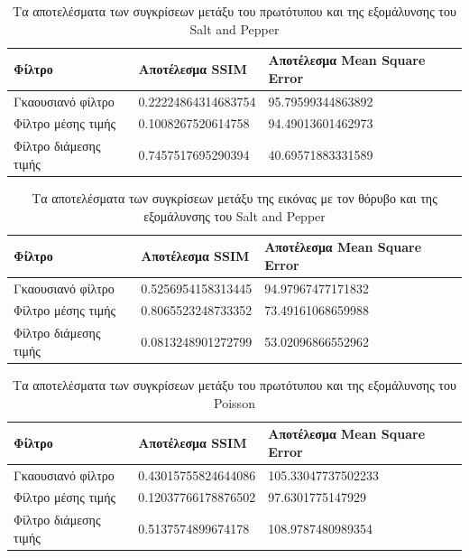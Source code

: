 \begin{table}
	\begin{tabular}{| p{2cm} | p{7cm} | p{6.5cm} |}
	\hline
	\textbf{Φίλτρο} & \textbf{Αποτέλεσμα SSIM} & \textbf{Αποτέλεσμα Mean Square Error} \\
	\hline
	Γκαουσιανό φίλτρο & 0.22224864314683754 & 95.79599344863892 \\
	\hline
	Φίλτρο μέσης τιμής & 0.1008267520614758 & 94.49013601462973 \\
	\hline
	Φίλτρο διάμεσης τιμής & 0.7457517695290394 & 40.69571883331589 \\
	\hline
	\end{tabular}
	\label{tab:results_sp_no_noise}
	\caption{Τα αποτελέσματα των συγκρίσεων μετάξυ του πρωτότυπου και της εξομάλυνσης του Salt and Pepper}
\end{table}

\begin{table}
	\begin{tabular}{| p{2cm} | p{7cm} | p{6.5cm} |}
	\hline
	\textbf{Φίλτρο} & \textbf{Αποτέλεσμα SSIM} & \textbf{Αποτέλεσμα Mean Square Error} \\
	\hline
	Γκαουσιανό φίλτρο & 0.5256954158313445 & 94.97967477171832 \\
	\hline
	Φίλτρο μέσης τιμής & 0.8065523248733352 & 73.49161068659988 \\
	\hline
	Φίλτρο διάμεσης τιμής & 0.0813248901272799 & 53.02096866552962 \\
	\hline
	\end{tabular}
	\label{tab:results_sp_noise}
	\caption{Τα αποτελέσματα των συγκρίσεων μετάξυ της εικόνας με τον θόρυβο και της εξομάλυνσης του Salt and Pepper}
\end{table}

\newpage
\begin{table}
	\begin{tabular}{| p{2cm} | p{7cm} | p{6.5cm} |}
	\hline
	\textbf{Φίλτρο} & \textbf{Αποτέλεσμα SSIM} & \textbf{Αποτέλεσμα Mean Square Error} \\
	\hline
	Γκαουσιανό φίλτρο & 0.43015755824644086 & 105.33047737502233 \\
	\hline
	Φίλτρο μέσης τιμής & 0.12037766178876502 & 97.6301775147929 \\
	\hline
	Φίλτρο διάμεσης τιμής & 0.5137574899674178 & 108.9787480989354 \\
	\hline
	\end{tabular}
	\label{tab:results_poisson_no_noise}
	\caption{Τα αποτελέσματα των συγκρίσεων μετάξυ του πρωτότυπου και της εξομάλυνσης του Poisson}
\end{table}

